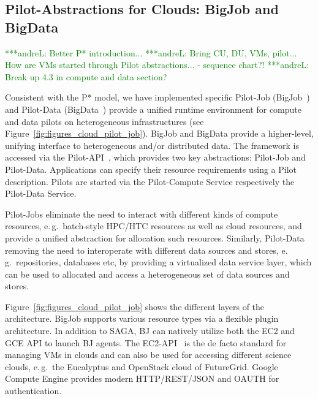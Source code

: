 \documentclass[times]{cpeauth}
\newcommand{\jhanote}[1]{ {\textcolor{red} { ***shantenu: #1 }}}
\newcommand{\alnote}[1]{ {\textcolor{green} { ***andreL: #1 }}}
\newcommand{\alnote}[1]{}
\newcommand{\jhanote}[1]{}
\newcommand{\pilot}{Pilot\xspace}
\newcommand{\pilots}{Pilots\xspace}
\newcommand{\pilotjob}{Pilot-Job\xspace}
\newcommand{\pilotjobs}{Pilot-Jobs\xspace}
\newcommand{\pilotdata}{Pilot-Data\xspace}
\newcommand{\pilotdataservice}{Pilot-Data Service\xspace}
\newcommand{\pilotcomputeservice}{Pilot-Compute Service\xspace}
\begin{document}





\subsection{Pilot-Abstractions for Clouds: BigJob and
  BigData}

\alnote{Better P* introduction...}
\alnote{Bring CU, DU, VMs, pilot... How are VMs started through Pilot 
abstractions... - sequence chart?!}
\alnote{Break up 4.3 in compute and data section?}

Consistent with the P* model, we have implemented specific \pilotjob
(BigJob~\cite{saga_bigjob_condor_cloud}) and \pilotdata
(BigData~\cite{Mantha:2012:PEF:2287016.2287020}) provide a unified
runtime environment for compute and data pilots on heterogeneous
infrastructures (see Figure~\ref{fig:figures_cloud_pilot_job}).
BigJob and BigData provide a higher-level, unifying interface to
heterogeneous and/or distributed data. The framework is accessed via
the Pilot-API~\cite{pilot_api}, which provides two key abstractions:
\pilotjob and \pilotdata. Applications can specify their resource
requirements using a \pilot description. \pilots are started via the
\pilotcomputeservice respectively the \pilotdataservice.

\pilotjobs eliminate the need to interact with different kinds of compute 
resources, e.\,g.\ batch-style HPC/HTC resources as well as cloud resources, 
and provide a unified abstraction for allocation such resources. Similarly, 
\pilotdata removing the need to interoperate with different data sources and 
stores, e.\,g.\ repositories, databases etc, by providing a virtualized data 
service layer, which can be used to allocated and access a heterogeneous set 
of data sources and stores.



Figure~\ref{fig:figures_cloud_pilot_job} shows the different layers of the
architecture. BigJob supports various resource types via a flexible plugin
architecture. In addition to SAGA, BJ can natively utilize both the EC2 and
GCE API to launch BJ agents. The EC2-API~\cite{amazonec2api} is the de facto 
standard for managing VMs in clouds and can also be used for accessing 
different science clouds, e.\,g.\ the Eucalyptus and OpenStack cloud of 
FutureGrid. Google Compute Engine provides modern HTTP/REST/JSON and OAUTH for 
authentication. 
\end{document}
